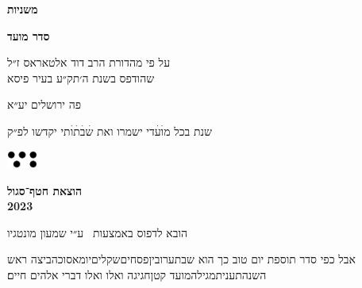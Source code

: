 \documentclass[14pt, a5paper, twoside, extrafontsizes]{memoir}
\begin{document}
\frontmatter
\pagestyle{myheadings}
\thispagestyle{mytitlepage}
\begin{hebrew}
{\Centering  

  {\huge\bfseries משניות}
  
  {\LARGE\bfseries סדר מועד}

  \vspace{1em}

  \vspace{0.5em}
  על פי מהדורת הרב דוד אלטאראס ז״ל\\שהודפס בשנת ה׳תק״ע בעיר פיסא

    \vspace{8em}
    פה {\LARGE ירושלים} יע״א

    {\small שנת}
    בכל מ{\Large וׄעׄ}די ישמרו ואת {\Large שׄבׄתׄוׄ}תי יקדשו
    {\small לפ״ק}
    
    \vspace{2em}
  \includegraphics[width=10mm]{hatafSegolLogoNoText.png}\\
  
    \vspace{.5em}
  {
    \bfseries הוצאת חטף־סגול\\2023
    
 {\footnotesize  הובא לדפוס באמצעות \XeLaTeX\ ע״י שמעון מונטגיו}

  }
    
}


\vspace{1em}
{
\parskip 2pt


\vspace{4pt}
{ \small
 {\larger  אבל} כפי סדר תוספת יום טוב כך הוא\hdot
 שבת\hdot ערובין\hdot פסחים\hdot שקלים\hdot יומא\hdot סוכה\hdot ביצה\hdot
 ראש השנה\hdot תענית\hdot מגילה\hdot מועד קטן\hdot חגיגה\hdot
 ואלו ואלו דברי אלהים חיים׃}
}
\mainmatter
\thispagestyle{empty}














\end{hebrew}
\end{document}
